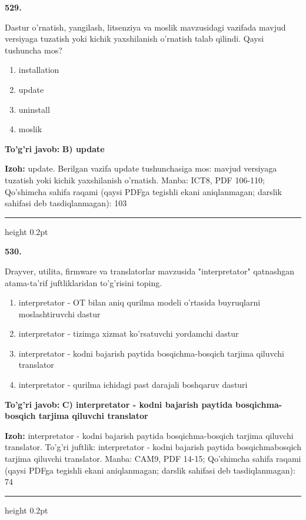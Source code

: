 \documentclass[10pt,a4paper]{article}
\begin{document}
{\bfseries\sffamily\color{ink} 529.}
\par
Dastur o'rnatish, yangilash, litsenziya va moslik mavzusidagi vazifada mavjud versiyaga tuzatish yoki kichik yaxshilanish o'rnatish talab qilindi. Qaysi tushuncha mos?
\begin{enumerate}[label=\Alph*),leftmargin=9mm]
\item installation
\item update
\item uninstall
\item moslik
\end{enumerate}
\begin{tcolorbox}[enhanced,breakable,colback=teal!4,colframe=teal!60!black,boxrule=0.45pt,arc=1.2mm,left=2.7mm,right=2.7mm,top=1.8mm,bottom=1.8mm,before skip=2mm,after skip=2mm]
{\bfseries\sffamily\color{teal}To'g'ri javob:} \textbf{B) update}
\par\smallskip
{\bfseries Izoh:} update. Berilgan vazifa update tushunchasiga mos: mavjud versiyaga tuzatish yoki kichik yaxshilanish o'rnatish. Manba: ICT8, PDF 106-110; Qo'shimcha sahifa raqami (qaysi PDFga tegishli ekani aniqlanmagan; darslik sahifasi deb tasdiqlanmagan): 103
\end{tcolorbox}
\vspace{2mm}\hrule height 0.2pt\vspace{3mm}

{\bfseries\sffamily\color{ink} 530.}
\par
Drayver, utilita, firmware va translatorlar mavzusida "interpretator" qatnashgan atama-ta'rif juftliklaridan to'g'risini toping.
\begin{enumerate}[label=\Alph*),leftmargin=9mm]
\item interpretator - OT bilan aniq qurilma modeli o'rtasida buyruqlarni moslashtiruvchi dastur
\item interpretator - tizimga xizmat ko'rsatuvchi yordamchi dastur
\item interpretator - kodni bajarish paytida bosqichma-bosqich tarjima qiluvchi translator
\item interpretator - qurilma ichidagi past darajali boshqaruv dasturi
\end{enumerate}
\begin{tcolorbox}[enhanced,breakable,colback=teal!4,colframe=teal!60!black,boxrule=0.45pt,arc=1.2mm,left=2.7mm,right=2.7mm,top=1.8mm,bottom=1.8mm,before skip=2mm,after skip=2mm]
{\bfseries\sffamily\color{teal}To'g'ri javob:} \textbf{C) interpretator - kodni bajarish paytida bosqichma-bosqich tarjima qiluvchi translator}
\par\smallskip
{\bfseries Izoh:} interpretator - kodni bajarish paytida bosqichma-bosqich tarjima qiluvchi translator. To'g'ri juftlik: interpretator - kodni bajarish paytida bosqichmabosqich tarjima qiluvchi translator. Manba: CAM9, PDF 14-15; Qo'shimcha sahifa raqami (qaysi PDFga tegishli ekani aniqlanmagan; darslik sahifasi deb tasdiqlanmagan): 74
\end{tcolorbox}
\vspace{2mm}\hrule height 0.2pt\vspace{3mm}
\end{document}
